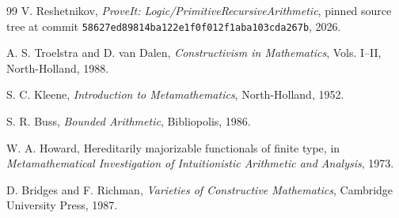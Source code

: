 \documentclass[11pt,oneside]{article}
\newcommand{\code}[1]{\nolinkurl{#1}}
\begin{document}
\begin{thebibliography}{99}
V. Reshetnikov, \emph{ProveIt: Logic/PrimitiveRecursiveArithmetic}, pinned source tree at commit
\code{58627ed89814ba122e1f0f012f1aba103cda267b}, 2026.

A. S. Troelstra and D. van Dalen, \emph{Constructivism in Mathematics}, Vols. I--II,
North-Holland, 1988.

S. C. Kleene, \emph{Introduction to Metamathematics}, North-Holland, 1952.

S. R. Buss, \emph{Bounded Arithmetic}, Bibliopolis, 1986.

W. A. Howard, Hereditarily majorizable functionals of finite type, in
\emph{Metamathematical Investigation of Intuitionistic Arithmetic and Analysis}, 1973.

D. Bridges and F. Richman, \emph{Varieties of Constructive Mathematics}, Cambridge University Press, 1987.
\end{thebibliography}
\end{document}
